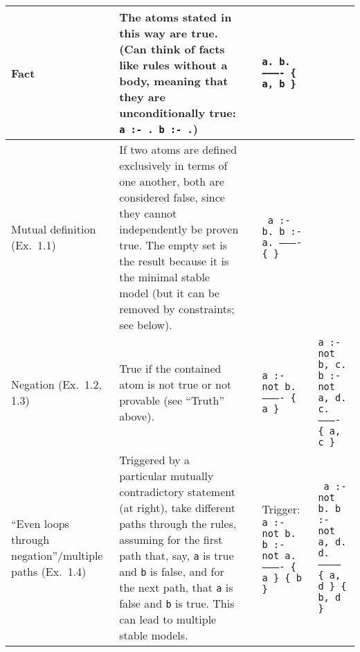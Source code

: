 \documentclass[10pt,a4paper,landscape]{article}
\begin{document}
\begin{longtable}{p{3cm}p{13.5cm}lp{4cm}p{4cm}}
	Fact 
		& The atoms stated in this way are true. (Can think of facts like rules without a body, meaning that they are unconditionally true: \texttt{a :- . b :- .})
		&& \texttt{a. \newline
				b. \newline
			 	---------- \newline
		 		\{ a, b \} } &\\ \midrule
	
	Mutual definition \newline (Ex.\ 1.1)
		& If two atoms are defined exclusively in terms of one another, both are considered false, since they cannot independently be proven true.
		The empty set is the result because it is the minimal stable model (but it can be removed by constraints; see below).
		&& \texttt{%
			a :- b. \newline
			b :- a. \newline
			---------- \newline				
		 	\{ \} } &\\ \midrule
	
	Negation \newline (Ex.\ 1.2, 1.3)
		& True if the contained atom is not true or not provable (see ``Truth'' above).
		&& \texttt{a :- not b. \newline
				  ---------- \newline
			  	  \{ a \} } 
		& \texttt{a :- not b, c. \newline
				b :- not a, d. \newline
				c. \newline
				---------- \newline
				\{ a, c \}} \\ \midrule
		
	``Even loops \newline through negation''\slash \newline multiple paths \newline (Ex.\ 1.4)
		& Triggered by a particular mutually contradictory statement (at right), take different paths through the rules, assuming for the first path that, say, \texttt{a} is true and \texttt{b} is false, and for the next path, that \texttt{a} is false and \texttt{b} is true.
		This can lead to multiple stable models.

		&& Trigger: \newline
		\texttt{%
			a :- not b. \newline
			b :- not a. \newline
			---------- \newline
			\{ a \} \newline
			\{ b \}}
		& \texttt{%
			a :- not b. \newline
			b :- not a, d. \newline
			d. \newline
			----------- \newline
			\{ a, d \} \newline
			\{ b, d \}} \newline \\ %
		


\end{longtable}
\end{document}
